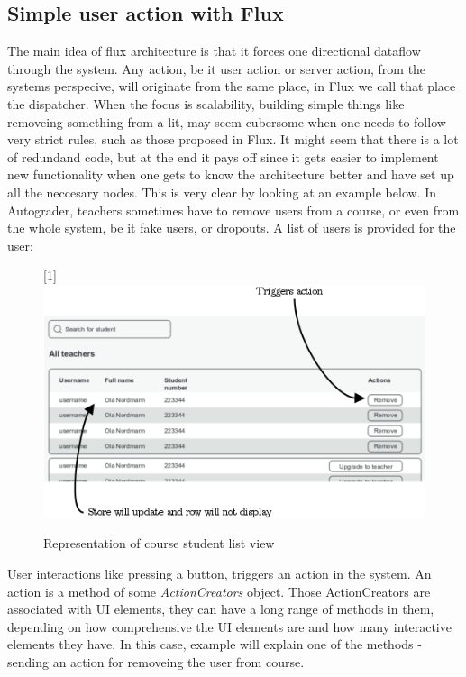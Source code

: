 \subsection{Simple user action with Flux}\label{sec:simplefluxexample}
The main idea of flux architecture is that it forces one directional dataflow through the system. Any action, be it user action or server action, from the systems perspecive, will originate from the same place, in Flux we call that place the dispatcher. When the focus is scalability, building simple things like removeing something from a lit, may seem cubersome when one needs to follow very strict rules, such as those proposed in Flux. It might seem that there is a lot of redundand code, but at the end it pays off since it gets easier to implement new functionality when one gets to know the architecture better and have set up all the neccesary nodes. This is very clear by looking at an example below. In Autograder, teachers sometimes have to remove users from a course, or even from the whole system, be it fake users, or dropouts. A list of users is provided for the user:\\
\begin{figure}[h]
  \scalebox{1}[1]{{\includegraphics[width=1\linewidth]{graphics/simpleremoveuser.png}}}
  \caption{Representation of course student list view}
  \label{fig:simpleremoveuser}
\end{figure}
\newpage
User interactions like pressing a button, triggers an action in the system. An action is a method of some \emph{ActionCreators} object. Those ActionCreators are associated with UI elements, they can have a long range of methods in them, depending on how comprehensive the UI elements are and how many interactive elements they have. In this case, example will explain one of the methods - sending an action for removeing the user from course.
